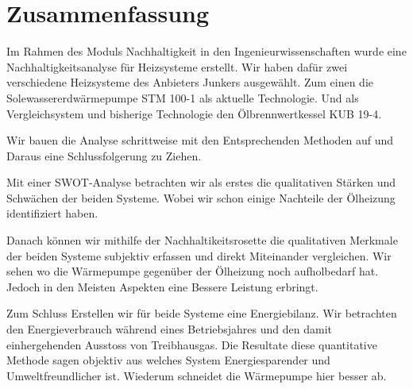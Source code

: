 \chapter*{Zusammenfassung}
\label{chap:zusammenfassung}

Im Rahmen des Moduls Nachhaltigkeit in den Ingenieurwissenschaften wurde eine
Nachhaltigkeitsanalyse für Heizsysteme erstellt.
Wir haben dafür zwei verschiedene Heizsysteme des Anbieters Junkers ausgewählt.
Zum einen die Solewassererdwärmepumpe STM 100-1 als aktuelle Technologie.
Und als Vergleichsystem und bisherige Technologie den Ölbrennwertkessel KUB 19-4. 

Wir bauen die Analyse schrittweise mit den Entsprechenden Methoden auf und
Daraus eine Schlussfolgerung zu Ziehen.

Mit einer SWOT-Analyse betrachten wir als erstes die qualitativen Stärken und
Schwächen der beiden Systeme. Wobei wir schon einige Nachteile der Ölheizung
identifiziert haben.

Danach können wir mithilfe der Nachhaltikeitsrosette die qualitativen Merkmale
der beiden Systeme subjektiv erfassen und direkt Miteinander vergleichen.
Wir sehen wo die Wärmepumpe gegenüber der Ölheizung noch aufholbedarf hat.
Jedoch in den Meisten Aspekten eine Bessere Leistung erbringt.

Zum Schluss Erstellen wir für beide Systeme eine Energiebilanz.
Wir betrachten den Energieverbrauch während eines Betriebsjahres und den
damit einhergehenden Ausstoss von Treibhausgas.
Die Resultate diese quantitative Methode sagen objektiv aus welches System
Energiesparender und Umweltfreundlicher ist.
Wiederum schneidet die Wärmepumpe hier besser ab.

